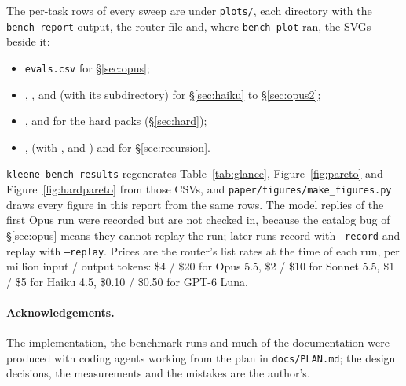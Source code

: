 \documentclass[11pt,a4paper]{article}
\newcommand{\code}[1]{\texttt{#1}}
\begin{document}
The per-task rows of every sweep are under \code{plots/}, each directory
with the \code{bench report} output, the router file and, where
\code{bench plot} ran, the SVGs beside it:

\begin{itemize}[leftmargin=1.5em,itemsep=1pt]
\item \code{evals.csv} for \S\ref{sec:opus};
\item {}, ,
   and  (with its
   subdirectory) for \S\ref{sec:haiku} to
  \S\ref{sec:opus2};
\item {},  and
   for the hard packs (\S\ref{sec:hard});
\item {}, 
  (with ,  and ) and
   for \S\ref{sec:recursion}.
\end{itemize}

\code{kleene bench results} regenerates Table~\ref{tab:glance},
Figure~\ref{fig:pareto} and Figure~\ref{fig:hardpareto} from those CSVs,
and \code{paper/figures/make\_figures.py} draws every figure in this
report from the same rows. The model replies of the first Opus
run were recorded but are not checked in, because the catalog bug of
\S\ref{sec:opus} means they cannot replay the run; later runs record with
\code{--record} and replay with \code{--replay}. Prices are the router's list
rates at the time of each run, per million input / output tokens: \$4 / \$20
for Opus 5.5, \$2 / \$10 for Sonnet 5.5, \$1 / \$5 for Haiku 4.5, \$0.10 /
\$0.50 for GPT-6 Luna.

\paragraph{Acknowledgements.} The implementation, the benchmark runs and much of
the documentation were produced with coding agents working from the plan in
\code{docs/PLAN.md}; the design decisions, the measurements and the mistakes
are the author's.



\end{document}
